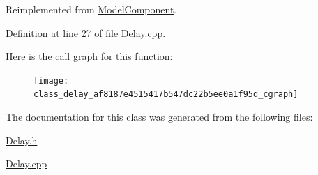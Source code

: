Reimplemented from \hyperlink{class_model_component_ad8bc846e36b028eab7efb7da6c549eca}{Model\-Component}.



Definition at line 27 of file Delay.\-cpp.



Here is the call graph for this function\-:\nopagebreak
\begin{figure}[H]
\begin{center}
\leavevmode
\texttt{[image: class\_delay\_af8187e4515417b547dc22b5ee0a1f95d\_cgraph]}
\end{center}
\end{figure}




The documentation for this class was generated from the following files\-:\begin{DoxyCompactItemize}
\item 
\hyperlink{_delay_8h}{Delay.\-h}\item 
\hyperlink{_delay_8cpp}{Delay.\-cpp}\end{DoxyCompactItemize}
